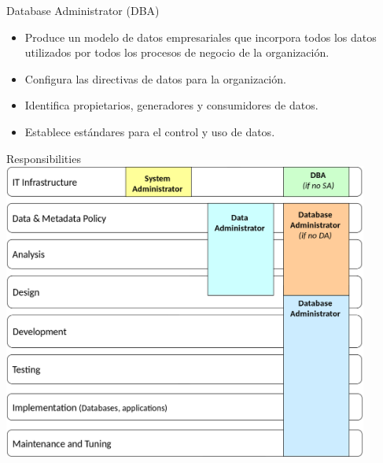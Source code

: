\documentclass{beamer}
\begin{document}
\begin{frame}{Database Administrator (DBA)}
    \begin{itemize}
        \item Produce un modelo de datos empresariales que incorpora todos los datos utilizados por todos los procesos de negocio de la organización.
        \item Configura las directivas de datos para la organización.
        \item Identifica propietarios, generadores y consumidores de datos.
        \item Establece estándares para el control y uso de datos.
    \end{itemize}
\end{frame}

\begin{frame}{Responsibilities}
    \centering
    \includegraphics[width=0.9\textwidth]{figures/responsibilities.png}
\end{frame}
\end{document}
